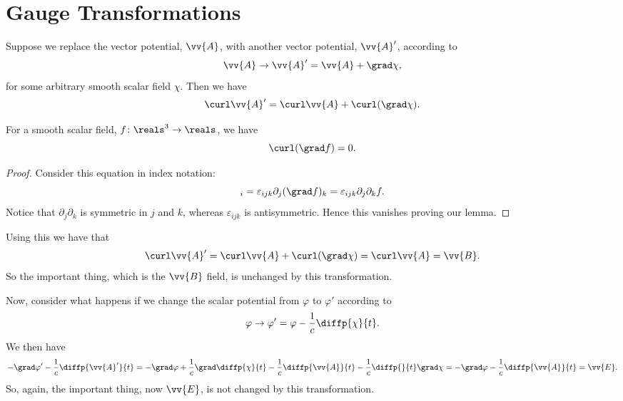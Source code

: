 \section{Gauge Transformations}
Suppose we replace the vector potential, \(\vv{A}\), with another vector potential, \(\vv{A}'\), according to
\begin{equation}
    \vv{A} \to \vv{A}' = \vv{A} + \grad\chi,
\end{equation}
for some arbitrary smooth scalar field \(\chi\).
Then we have
\begin{equation}
    \curl\vv{A}' = \curl\vv{A} + \curl(\grad\chi).
\end{equation}
\begin{lma}{}{}
    For a smooth scalar field, \(f\colon\reals^3 \to \reals\), we have
    \begin{equation}
        \curl(\grad f) = 0.
    \end{equation}
    \begin{proof}
        Consider this equation in index notation:
        \begin{equation}
            [\curl(\grad f)]_i = \varepsilon_{ijk}\partial_j(\grad f)_k = \varepsilon_{ijk}\partial_j\partial_kf.
        \end{equation}
        Notice that \(\partial_j\partial_k\) is symmetric in \(j\) and \(k\), whereas \(\varepsilon_{ijk}\) is antisymmetric.
        Hence this vanishes proving our lemma.
    \end{proof}
\end{lma}
Using this we have that
\begin{equation}
    \curl\vv{A}' = \curl\vv{A} + \curl(\grad\chi) = \curl\vv{A} = \vv{B}.
\end{equation}
So the important thing, which is the \(\vv{B}\) field, is unchanged by this transformation.

Now, consider what happens if we change the scalar potential from \(\varphi\) to \(\varphi'\) according to
\begin{equation}
    \varphi \to \varphi' = \varphi - \frac{1}{c}\diffp{\chi}{t}.
\end{equation}
We then have
\begin{equation}
    -\grad\varphi' - \frac{1}{c}\diffp{\vv{A}'}{t} = -\grad\varphi + \frac{1}{c}\grad\diffp{\chi}{t} - \frac{1}{c}\diffp{\vv{A}}{t} - \frac{1}{c}\diffp{}{t}\grad\chi = -\grad\varphi - \frac{1}{c}\diffp{\vv{A}}{t} = \vv{E}.
\end{equation}
So, again, the important thing, now \(\vv{E}\), is not changed by this transformation.

